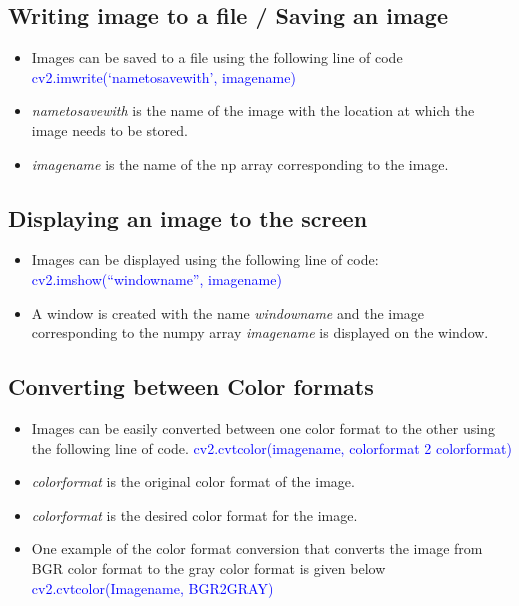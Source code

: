 \documentclass[a4paper,12pt]{article}
\begin{document}
\subsection{Writing image to a file / Saving an image}
\begin{itemize}
 \item Images can be saved to a file using the following line of code
 \newline \textcolor{blue}{cv2.imwrite(‘name\textunderscore to\textunderscore save\textunderscore with’, image\textunderscore name)}
 \item \emph{name\textunderscore to\textunderscore save\textunderscore with} is the name of the image with the location at which the image
 needs to be stored. 
 \item \emph{image\textunderscore name} is the name of the np array corresponding to the image.
 
\end{itemize}

\subsection{Displaying an image to the screen}
\begin{itemize}
 \item Images can be displayed using the following line of code:
 \newline \textcolor{blue}{ cv2.imshow(“window\textunderscore name”, image\textunderscore name)}
 \item A window is created with the name \emph{window\textunderscore name} and the image corresponding to the numpy array
 \emph{image\textunderscore name} is  displayed on the window.
 
\end{itemize}

\subsection{Converting between Color formats}
\begin{itemize}
 \item Images can be easily converted between one color format to the other using the following line of code.
 \newline \textcolor{blue} {cv2.cvtcolor(image\textunderscore name, color\textunderscore format 2  color\textunderscore format)}
 \item \emph{color\textunderscore format} is the original color format of the image.
 \item \emph{color\textunderscore format} is the desired color format for the image.
 \item One example of the color format conversion that converts the image from BGR color format to the gray color format is given below
 \newline \textcolor{blue}{cv2.cvtcolor(Image\textunderscore name, BGR2GRAY)}
 \end{itemize}
\end{document}
